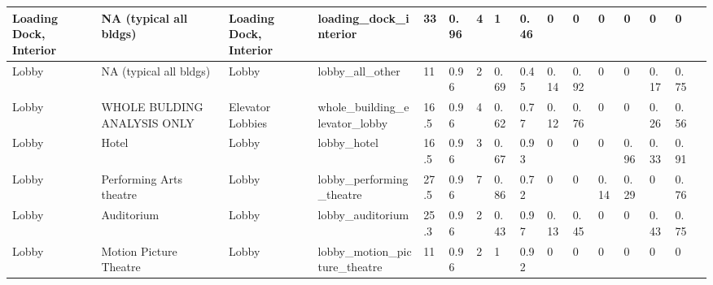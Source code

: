 \begin{center}
\begin{landscape}
\begin{longtable}{|p{0.75in}|p{0.75in}|p{0.75in}|p{0.75in}|p{0.3in}|p{0.3in}|p{0.3in}|p{0.3in}|p{0.3in}|p{0.3in}|p{0.3in}|p{0.3in}|p{0.3in}|p{0.3in}|p{0.3in}|p{0.6in}|}
      Loading Dock, Interior                  & NA (typical all bldgs)      & Loading Dock, Interior                          & loading\_dock\_interior                                         & 33   & 0.96 & 4  & 1      & 0.46  & 0     & 0     & 0    & 0    & 0    & 0    &                                                                                       \\ \hline
      Lobby                                   & NA (typical all bldgs)      & Lobby                                           & lobby\_all\_other                                               & 11   & 0.96 & 2  & 0.69   & 0.45  & 0.14  & 0.92  & 0    & 0    & 0.17 & 0.75 &                                                                                       \\ \hline
      Lobby                                   & WHOLE BULDING ANALYSIS ONLY & Elevator Lobbies                                & whole\_building\_elevator\_lobby                                & 16.5 & 0.96 & 4  & 0.62   & 0.77  & 0.12  & 0.76  & 0    & 0    & 0.26 & 0.56 &                                                                                       \\ \hline
      Lobby                                   & Hotel                       & Lobby                                           & lobby\_hotel                                                    & 16.5 & 0.96 & 3  & 0.67   & 0.93  & 0     & 0     & 0    & 0.96 & 0.33 & 0.91 &                                                                                       \\ \hline
      Lobby                                   & Performing Arts theatre     & Lobby                                           & lobby\_performing\_theatre                                      & 27.5 & 0.96 & 7  & 0.86   & 0.72  & 0     & 0     & 0.14 & 0.29 & 0    & 0.76 &                                                                                       \\ \hline
      Lobby                                   & Auditorium                  & Lobby                                           & lobby\_auditorium                                               & 25.3 & 0.96 & 2  & 0.43   & 0.97  & 0.13  & 0.45  & 0    & 0    & 0.43 & 0.75 &                                                                                       \\ \hline
      Lobby                                   & Motion Picture Theatre      & Lobby                                           & lobby\_motion\_picture\_theatre                                 & 11   & 0.96 & 2  & 1      & 0.92  & 0     & 0     & 0    & 0    & 0    & 0    &                                                                                       \\ \hline

\end{longtable}
\end{landscape}
\end{center}

